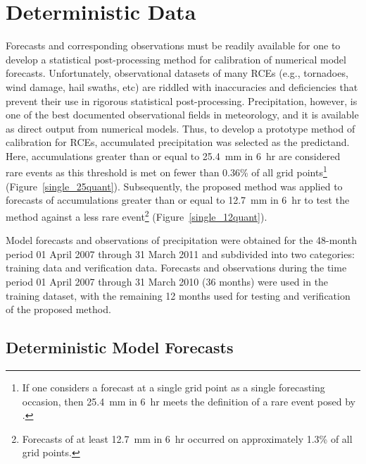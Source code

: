 

\section{Deterministic Data}
\label{ddata}

Forecasts and corresponding observations must be readily available for one to develop a statistical post-processing method for calibration of numerical model forecasts.
Unfortunately, observational datasets of many RCEs (e.g., tornadoes, wind damage, hail swaths, etc) are riddled with inaccuracies and deficiencies \citep{Doswell1988, Weiss2002, Trapp2006, Ortega2009} that prevent their use in rigorous statistical post-processing.
Precipitation, however, is one of the best documented observational fields in meteorology, and it is available as direct output from numerical models.
Thus, to develop a prototype method of calibration for RCEs, accumulated precipitation was selected as the predictand.
Here, accumulations greater than or equal to \mbox{25.4 mm} in \mbox{6 hr} are considered rare events as this threshold is met on fewer than 0.36\% of all grid points\footnote{If one considers a forecast at a single grid point as a single forecasting occasion, then \mbox{25.4 mm} in \mbox{6 hr} meets the definition of a rare event posed by \cite{Murphy1991}.} (\mbox{Figure \ref{single_25quant}}).
Subsequently, the proposed method was applied to forecasts of accumulations greater than or equal to \mbox{12.7 mm} in \mbox{6 hr} to test the method against a less rare event\footnote{Forecasts of at least \mbox{12.7 mm} in \mbox{6 hr} occurred on approximately 1.3\% of all grid points.} (\mbox{Figure \ref{single_12quant}}).


Model forecasts and observations of precipitation were obtained for the 48-month period 01 April 2007 through 31 March 2011 and subdivided into two categories: training data and verification data.
Forecasts and observations during the time period 01 April 2007 through 31 March 2010 (36 months) were used in the training dataset, with the remaining 12 months used for testing and verification of the proposed method.




\subsection{Deterministic Model Forecasts}
\label{dmodel}

